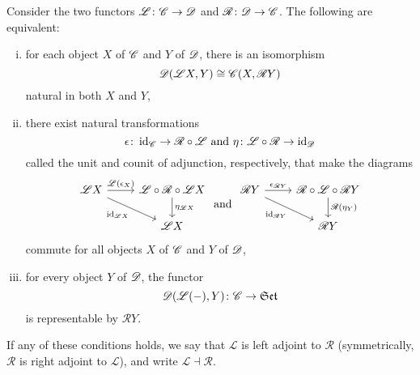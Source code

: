 \documentclass[10pt]{amsart}
\begin{document}
\newcommand{\LA}{\mathscr{L}}
\newcommand{\RA}{\mathscr{R}}
\begin{prop}\label{adjoints}
  Consider the two functors $\mathscr{L} \colon \mathscr{C} \to \mathscr{D}$ and $\mathscr{R} \colon \mathscr{D} \to \mathscr{C}$.
  The following are equivalent:
  \begin{enumerate}[(i)]
  \item
    for each object $X$ of $\mathscr{C}$ and $Y$ of $\mathscr{D}$, there is an isomorphism
    $$\D(\LA X, Y) \cong \C(X, \RA Y)$$
    natural in both $X$ and $Y$,
  \item
    there exist natural transformations
    $$\epsilon \colon \id_\C \to \RA \circ \LA\ \text{and}\ \eta \colon \LA \circ \RA \to \id_\D$$
    called the unit and counit of adjunction, respectively, that make the diagrams
    $$\begin{tikzcd}
      \LA X \arrow[swap]{rd}{\id_{\LA X}}\arrow{r}{\LA(\epsilon_X)} & \LA \circ \RA \circ \LA X \arrow{d}{\eta_{\LA X}}\\
      & \LA X
    \end{tikzcd}
    \ \text{and}\ 
    \begin{tikzcd}
      \RA Y \arrow{r}{\epsilon_{\RA Y}}\arrow[swap]{rd}{\id_{\RA Y}} & \RA \circ \LA \circ \RA Y \arrow{d}{\RA(\eta_Y)}\\
      & \RA Y
    \end{tikzcd}$$
    commute for all objects $X$ of $\mathscr{C}$ and $Y$ of $\mathscr{D}$,
  \item
    for every object $Y$ of $\mathscr{D}$, the functor 
    $$\D(\LA( - ), Y) \colon \C \to \Sets$$
    is representable by $\RA Y$.
  \end{enumerate}
  If any of these conditions holds, we say that $\LA$ is left adjoint to $\RA$ (symmetrically, $\RA$ is right adjoint to $\LA$), and write $\LA \dashv \RA$.
  

\end{prop}
\end{document}
